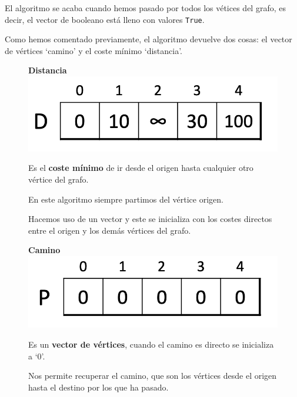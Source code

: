 El algoritmo se acaba cuando hemos pasado por todos los vétices del grafo, es decir, el vector de booleano está lleno con valores \texttt{True}.

Como hemos comentado previamente, el algoritmo devuelve dos cosas: el vector de vértices `camino' y el coste mínimo `distancia'.
\newpage
\begin{figure}[h]
  \begin{minipage}{0.4\textwidth}
    \begin{center}
      \textbf{Distancia}
      \includegraphics[width=\textwidth]{assets/dij3.png}
    \end{center}
  Es el \textbf{coste mínimo} de ir desde el origen hasta cualquier otro vértice del grafo.

  En este algoritmo siempre partimos del vértice origen.

  Hacemos uso de un vector y este se inicializa con los costes directos entre el origen y los demás vértices del grafo.

  \end{minipage}
  \hfill
  \begin{minipage}{0.4\textwidth}
  \vspace*{-2cm}
  \begin{center}
    \textbf{Camino}
    \includegraphics[width=\textwidth]{assets/dij4.png} 
  \end{center}
  Es un \textbf{vector de vértices}, cuando el camino es directo se inicializa a `0'.

  Nos permite recuperar el camino, que son los vértices desde el origen hasta el destino por los que ha pasado.
  \end{minipage}
\end{figure}


